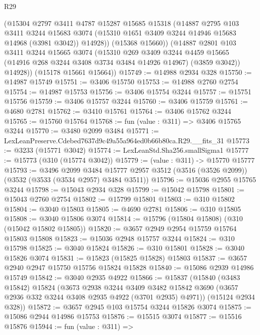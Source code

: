 \begin{lexlean}{R29}
\begin{coremodule}
          (@15304
            @2797
            @3411
            @4787
            @15287
            @15685
            @15318
            (@14887
              @2795
              @103
              @3411
              @3244
              @15683
              @3074
              (@15310 @1651 @3409 @3244 @14946 @15683 @14968 (@3981 @3042))
              @14928))
          (@15368 @15660))
        (@14887
          @2801
          @103
          @3411
          @3244
          @15665
          @3074
          (@15310
            @269
            @3409
            @3244
            @4459
            @15665
            (@14916 @268 @3244 @3408 @3734 @3484 @14926 @14967)
            (@3859 @3042))
          @14928))
      (@15178 @15661 @15664))
@15749 := @14988 @2934 @328
@15750 := @14987 @15749
@15751 := @3406 @15750
@15753 := @14988 @2760 @2754
@15754 := @14987 @15753
@15756 := @3406 @15754 @3244
@15757 := @15751 @15756
@15759 := @3406 @15757 @3244
@15760 := @3406 @15759
@15761 := @4680 @2781
@15762 := @3410 @15761
@15764 := @3406 @15762 @3244
@15765 := @15760 @15764
@15768 := fun (value : @311) => @3406 @15765 @3244
@15770 := @3480 @2099 @3484
@15771 := LexLeanPreserve.Cdebed7637d9c49a55a964ed0b66b80ca.R29.__fits_31
@15773 := @3233 (@15771 @3042)
@15774 := LexLeanStd.Sha256.smallSigma1
@15777 := @15773 (@310 (@15774 @3042))
@15779 := (value : @311) -> @15770 @15777
@15793 := @3496
    @2099
    @3484
    @15777
    @2957
    @3512
    (@3516 (@3526 @2099))
    (@3532 (@3533 (@3534 @2957) @3484 @3511))
@15796 := @15036 @2955 @15765 @3244
@15798 := @15043 @2934 @328
@15799 := @15042 @15798
@15801 := @15043 @2760 @2754
@15802 := @15799 @15801
@15803 := @310 @15802
@15804 := @3040 @15803
@15805 := @4690 @2781
@15806 := @310 @15805
@15808 := @3040 @15806 @3074
@15814 := @15796 (@15804 @15808) (@310 (@15042 @15802 @15805))
@15820 := @3657 @2949 @2954 @15759 @15764 @15803 @15808
@15823 := @15036 @2948 @15757 @3244
@15824 := @310 @15798
@15825 := @3040 @15824
@15826 := @310 @15801
@15828 := @3040 @15826 @3074
@15831 := @15823 (@15825 @15828) @15803
@15837 := @3657 @2940 @2947 @15750 @15756 @15824 @15828
@15840 := @15086 @2939 @14986 @15749
@15842 := @3040 @2935 @4922
@15866 := @15837
    (@15840
      (@3483 @15842)
      @15824
      (@3673
        @2938
        @3244
        @3409
        @3482
        @15842
        @3690
        (@3657 @2936 @332 @3244 @3408 @2935 @4922 (@3701 @2935) @4971))
      (@15124 @2934 @328))
@15872 := @3657 @2945 @103 @15754 @3244 @15826 @3074
@15875 := @15086 @2944 @14986 @15753
@15876 := @15515 @3074
@15877 := @15516 @15876
@15944 := fun (value : @311) =>

\end{coremodule}
\end{lexlean}
